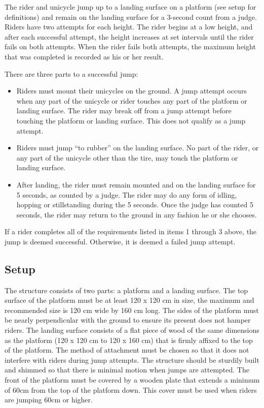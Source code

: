 The rider and unicycle jump up to a landing surface on a platform (see setup for definitions) and remain on the landing surface for a 3-second count from a judge.
Riders have two attempts for each height.
The rider begins at a low height, and after each successful attempt, the height increases at set intervals until the rider fails on both attempts.
When the rider fails both attempts, the maximum height that was completed is recorded as his or her result.

There are three parts to a successful jump:
\begin{itemize}
\item Riders must mount their unicycles on the ground.
A jump attempt occurs when any part of the unicycle or rider touches any part of the platform or landing surface.
The rider may break off from a jump attempt before touching the platform or landing surface.
This does not qualify as a jump attempt.
\item Riders must jump ``to rubber'' on the landing surface.
No part of the rider, or any part of the unicycle other than the tire, may touch the platform or landing surface.
\item After landing, the rider must remain mounted and on the landing surface for 5 seconds, as counted by a judge.
The rider may do any form of idling, hopping or stillstanding during the 5 seconds.
Once the judge has counted 5 seconds, the rider may return to the ground in any fashion he or she chooses.
\end{itemize}
If a rider completes all of the requirements listed in items 1 through 3 above, the jump is deemed successful.
Otherwise, it is deemed a failed jump attempt.

\subsection{Setup}
The structure consists of two parts: a platform and a landing surface.
The top surface of the platform must be at least 120 x 120 cm in size, the maximum and recommended size is 120 cm wide by 160 cm long.
The sides of the platform must be nearly perpendicular with the ground to ensure its present does not hamper riders.
The landing surface consists of a flat piece of wood of the same dimensions as the platform (120 x 120 cm to 120 x 160 cm) that is firmly affixed to the top of the platform.
The method of attachment must be chosen so that it does not interfere with riders during jump attempts.
The structure should be sturdily built and shimmed so that there is minimal motion when jumps are attempted.
The front of the platform must be covered by a wooden plate that extends a minimum of 60cm from the top of the platform down.
This cover must be used when riders are jumping 60cm or higher.

